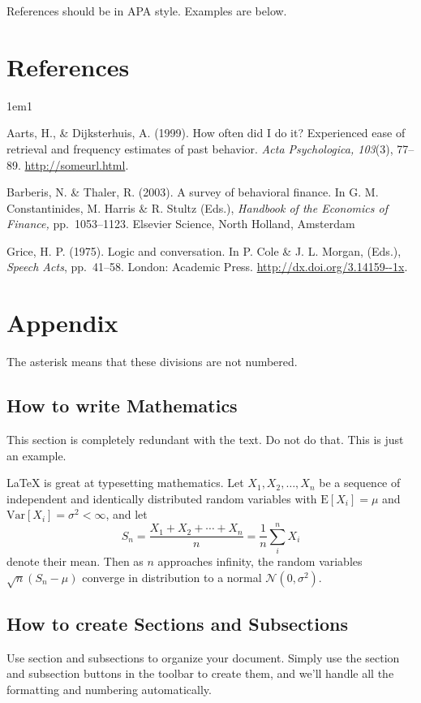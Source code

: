 \documentclass[12pt]{article}
\begin{document}
References should be in APA style. Examples are below.

%
%
\section*{References}

\begin{hangparas}{1em}{1}

  Aarts, H., \& Dijksterhuis, A. (1999).  How often did I do it?
  Experienced ease of retrieval and frequency estimates of past
  behavior.  \textit{Acta Psychologica, 103}(3), 77--89. \url{http://someurl.html}.

  Barberis, N. \& Thaler, R. (2003). A survey of behavioral finance.
  In G. M. Constantinides, M. Harris \& R. Stultz (Eds.),
  \textit{Handbook of the Economics of Finance,} pp.\ 1053--1123.
  Elsevier Science, North Holland, Amsterdam

\vfill %
\break

Grice, H. P. (1975).  Logic and conversation. In P. Cole \& J.
L. Morgan, (Eds.), \textit{Speech Acts}, pp.\ 41--58. London: Academic
Press. \url{http://dx.doi.org/3.14159--1x}.
\end{hangparas}

\bigskip
\section*{Appendix}

The asterisk means that these divisions are not numbered.

\subsection*{How to write Mathematics}

This section is completely redundant with the text. Do not do
that. This is just an example.

\LaTeX{} is great at typesetting mathematics. Let $X_1, X_2, \ldots, X_n$ be a sequence of independent and identically distributed random variables with $\text{E}[X_i] = \mu$ and $\text{Var}[X_i] = \sigma^2 < \infty$, and let
\[S_n = \frac{X_1 + X_2 + \cdots + X_n}{n}
      = \frac{1}{n}\sum_{i}^{n} X_i\]
denote their mean. Then as $n$ approaches infinity, the random variables $\sqrt{n}(S_n - \mu)$ converge in distribution to a normal $\mathcal{N}(0, \sigma^2)$.


\subsection*{How to create Sections and Subsections}

Use section and subsections to organize your document. Simply use the section and subsection buttons in the toolbar to create them, and we'll handle all the formatting and numbering automatically.
\end{document}
